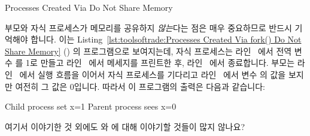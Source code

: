 \begin{listing}[tbp]

\caption{Processes Created Via  Do Not Share Memory}
\label{lst:toolsoftrade:Processes Created Via fork() Do Not Share Memory}
\end{listing}

\begin{lineref}
부모와 자식 프로세스가 메모리를 공유하지 \emph{않는}다는 점은 매우 중요하므로
반드시 기억해야 합니다.
이는
Listing~\ref{lst:toolsoftrade:Processes Created Via fork() Do Not Share Memory}
() 의 프로그램으로 보여지는데, 자식 프로세스는
라인~ 에서 전역 변수  를 1로 만들고 라인~ 에서
메세지를 프린트한 후, 라인~ 에서 종료합니다.
부모는 라인~ 에서 실행 흐름을 이어서 자식 프로세스를 기다리고
라인~ 에서 변수  의 값을 보지만 여전히 그 값은 0입니다.
따라서 이 프로그램의 출력은 다음과 같습니다:
\end{lineref}

\begin{VerbatimU}
Child process set x=1
Parent process sees x=0
\end{VerbatimU}

\QuickQuiz{}
	여기서 이야기한 것 외에도  와  에 대해 이야기할
	것들이 많지 않나요?
	\iffalse

